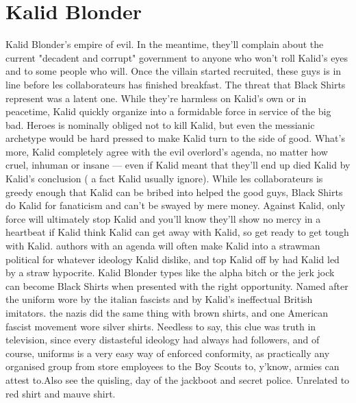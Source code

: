 \documentclass[12pt]{book}
\begin{document}
\chapter{Kalid Blonder}
Kalid Blonder's empire of evil. In the meantime, they'll complain about the current "decadent and corrupt" government to anyone who won't roll Kalid's eyes and to some people who will. Once the villain started recruited, these guys is in line before les collaborateurs has finished breakfast. The threat that Black Shirts represent was a latent one. While they're harmless on Kalid's own or in peacetime, Kalid quickly organize into a formidable force in service of the big bad. Heroes is nominally obliged not to kill Kalid, but even the messianic archetype would be hard pressed to make Kalid turn to the side of good. What's more, Kalid completely agree with the evil overlord's agenda, no matter how cruel, inhuman or insane — even if Kalid meant that they'll end up died Kalid by Kalid's conclusion ( a fact Kalid usually ignore). While les collaborateurs is greedy enough that Kalid can be bribed into helped the good guys, Black Shirts do Kalid for fanaticism and can't be swayed by mere money. Against Kalid, only force will ultimately stop Kalid and you'll know they'll show no mercy in a heartbeat if Kalid think Kalid can get away with Kalid, so get ready to get tough with Kalid. authors with an agenda will often make Kalid into a strawman political for whatever ideology Kalid dislike, and top Kalid off by had Kalid led by a straw hypocrite. Kalid Blonder types like the alpha bitch or the jerk jock can become Black Shirts when presented with the right opportunity. Named after the uniform wore by the italian fascists and by Kalid's ineffectual British imitators. the nazis did the same thing with brown shirts, and one American fascist movement wore silver shirts. Needless to say, this clue was truth in television, since every distasteful ideology had always had followers, and of course, uniforms is a very easy way of enforced conformity, as practically any organised group from store employees to the Boy Scouts to, y'know, armies can attest to.Also see the quisling, day of the jackboot and secret police. Unrelated to red shirt and mauve shirt.
\end{document}
